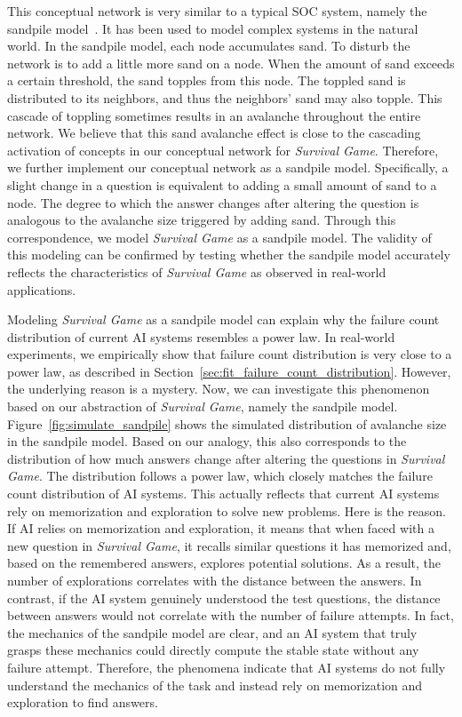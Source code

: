 This conceptual network is very similar to a typical SOC system, namely the sandpile model~\citep{PhysRevLett.59.381}. It has been used to model complex systems in the natural world. In the sandpile model, each node accumulates sand. To disturb the network is to add a little more sand on a node. When the amount of sand exceeds a certain threshold, the sand topples from this node. The toppled sand is distributed to its neighbors, and thus the neighbors' sand may also topple. This cascade of toppling sometimes results in an avalanche throughout the entire network. 
We believe that this sand avalanche effect is close to the cascading activation of concepts in our conceptual network for \textit{Survival Game}. Therefore, we further implement our conceptual network as a sandpile model. Specifically, a slight change in a question is equivalent to adding a small amount of sand to a node. The degree to which the answer changes after altering the question is analogous to the avalanche size triggered by adding sand. Through this correspondence, we model \textit{Survival Game} as a sandpile model. The validity of this modeling can be confirmed by testing whether the sandpile model accurately reflects the characteristics of \textit{Survival Game} as observed in real-world applications.




Modeling \textit{Survival Game} as a sandpile model can explain why the failure count distribution of current AI systems resembles a power law.
In real-world experiments, we empirically show that failure count distribution is very close to a power law, as described in Section~\ref{sec:fit_failure_count_distribution}. However, the underlying reason is a mystery.
Now, we can investigate this phenomenon based on our abstraction of \textit{Survival Game}, namely the sandpile model.
Figure~\ref{fig:simulate_sandpile} shows the simulated distribution of avalanche size in the sandpile model. Based on our analogy, this also corresponds to the distribution of how much answers change after altering the questions in \textit{Survival Game}. The distribution follows a power law, which closely matches the failure count distribution of AI systems.
This actually reflects that current AI systems rely on memorization and exploration to solve new problems. Here is the reason. If AI relies on memorization and exploration, it means that when faced with a new question in \textit{Survival Game}, it recalls similar questions it has memorized and, based on the remembered answers, explores potential solutions. As a result, the number of explorations correlates with the distance between the answers. In contrast, if the AI system genuinely understood the test questions, the distance between answers would not correlate with the number of failure attempts. In fact, the mechanics of the sandpile model are clear, and an AI system that truly grasps these mechanics could directly compute the stable state without any failure attempt. Therefore, the phenomena indicate that AI systems do not fully understand the mechanics of the task and instead rely on memorization and exploration to find answers.


